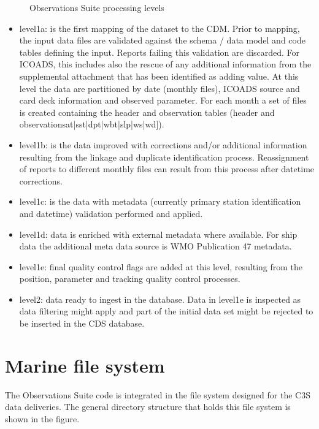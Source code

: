 \documentclass[letterpaper,10pt,english]{sphinxmanual}
\let\sphinxpxdimen\pdfpxdimen\else\newdimen\sphinxpxdimen
\begin{document}
\begin{figure}[htbp]
\centering
\capstart

\noindent\sphinxincludegraphics[width=500\sphinxpxdimen]{{obs_suite_levels}.png}
\caption{Observations Suite processing levels}\label{\detokenize{index:id4}}\end{figure}
\begin{itemize}
\item {}
level1a: is the first mapping of the dataset to the CDM. Prior to mapping,
the input data files are validated against the schema / data model and code
tables defining the input. Reports failing this validation are discarded. For
ICOADS, this includes also the rescue of any additional information from the
supplemental attachment that has been identified as adding value. At this
level the data are partitioned by date (monthly files), ICOADS source and card
deck information and observed parameter. For each month a set of files is
created containing the header and observation tables (header and
observations\sphinxhyphen{}{[}at|sst|dpt|wbt|slp|ws|wd{]}).

\item {}
level1b: is the data improved with corrections and/or additional information
resulting from the linkage and duplicate identification process. Reassignment of
reports to different monthly files can result from this process after datetime
corrections.

\item {}
level1c: is the data with metadata (currently primary station identification
and datetime) validation performed and applied.

\item {}
level1d: data is enriched with external meta\sphinxhyphen{}data where available. For ship
data the additional meta data source is WMO Publication 47 metadata.

\item {}
level1e: final quality control flags are added at this level, resulting from
the position, parameter and tracking quality control processes.

\item {}
level2: data ready to ingest in the database. Data in level1e is inspected as
data filtering might apply and part of the initial data set might be rejected
to be inserted in the CDS database.

\end{itemize}


\chapter{Marine file system}
\label{\detokenize{index:marine-file-system}}
The Observations Suite code is integrated in the file system designed for the
C3S data deliveries. The general directory structure that holds this file system
is shown in the figure.
\end{document}
